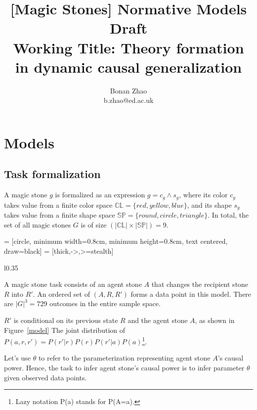 \documentclass{article}
\title{
	[Magic Stones] Normative Models Draft \\
	\large Working Title:
	Theory formation in dynamic causal generalization
}
\author{
	Bonan Zhao\\
	b.zhao@ed.ac.uk
}
\newcommand{\colorspace}{\mathbb{CL}}
\newcommand{\shapespace}{\mathbb{SP}}
\begin{document}
\maketitle

\section{Models}

\subsection*{Task formalization}

A magic stone $g$ is formalized as an expression $g = c_g \wedge s_g$, 
where its color $c_g$ takes value from a finite color space $\colorspace=\{red, yellow, blue\}$, 
and its shape $s_g$ takes value from a finite shape space $\shapespace=\{round, circle, triangle\}$.
In total, the set of all magic stones $G$ is of size $(|\colorspace| \times |\shapespace|) = 9$.


 = [circle, minimum width=0.8cm, minimum height=0.8cm, text centered, draw=black]
 = [thick,->,>=stealth]
\begin{wrapfigure}{l}{0.35\textwidth}
\begin{center}
	\caption{A magic stone task.}
	\label{model}
\end{center}
\end{wrapfigure}


A magic stone task consists of an agent stone $A$ that changes the recipient stone $R$ into $R'$.
An ordered set of $(A, R, R')$ forms a data point in this model. There are $|G|^3 = 729$ outcomes in the entire sample space.

$R'$ is conditional on its previous state $R$ and the agent stone $A$, as shown in Figure~\ref{model}
The joint distribution of $P(a, r, r') = P(r'|r)P(r)P(r'|a)P(a)$\footnote{
	Lazy notation P(a) stands for P(A=a).
}.

Let's use $\theta$ to refer to the parameterization representing agent stone $A$'s causal power. Hence, the task to infer agent stone's causal power is to infer parameter $\theta$ given observed data points.
\end{document}

